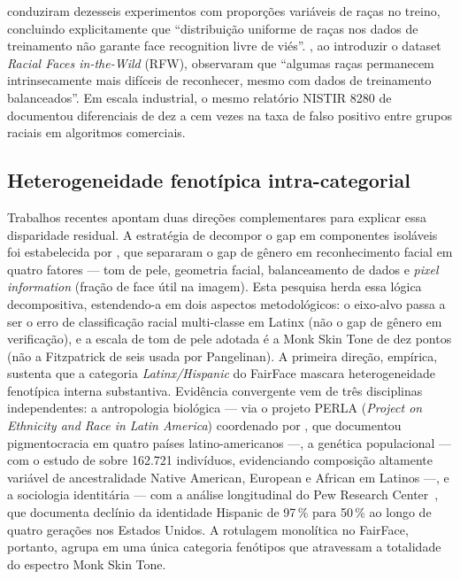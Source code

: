  conduziram dezesseis experimentos com proporções variáveis de raças no treino, concluindo explicitamente que ``distribuição uniforme de raças nos dados de treinamento não garante face recognition livre de viés''. , ao introduzir o dataset \emph{Racial Faces in-the-Wild} (RFW), observaram que ``algumas raças permanecem intrinsecamente mais difíceis de reconhecer, mesmo com dados de treinamento balanceados''. Em escala industrial, o mesmo relatório NISTIR 8280 de  documentou diferenciais de dez a cem vezes na taxa de falso positivo entre grupos raciais em algoritmos comerciais.

\subsection{Heterogeneidade fenotípica intra-categorial}
\label{sec:problema_heterogeneidade}

Trabalhos recentes apontam duas direções complementares para explicar essa disparidade residual. A estratégia de decompor o gap em componentes isoláveis foi estabelecida por , que separaram o gap de gênero em reconhecimento facial em quatro fatores --- tom de pele, geometria facial, balanceamento de dados e \emph{pixel information} (fração de face útil na imagem). Esta pesquisa herda essa lógica decompositiva, estendendo-a em dois aspectos metodológicos: o eixo-alvo passa a ser o erro de classificação racial multi-classe em Latinx (não o gap de gênero em verificação), e a escala de tom de pele adotada é a Monk Skin Tone de dez pontos (não a Fitzpatrick de seis usada por Pangelinan). A primeira direção, empírica, sustenta que a categoria \emph{Latinx/Hispanic} do FairFace mascara heterogeneidade fenotípica interna substantiva. Evidência convergente vem de três disciplinas independentes: a antropologia biológica --- via o projeto PERLA (\emph{Project on Ethnicity and Race in Latin America}) coordenado por , que documentou pigmentocracia em quatro países latino-americanos ---, a genética populacional --- com o estudo de  sobre 162.721 indivíduos, evidenciando composição altamente variável de ancestralidade Native American, European e African em Latinos ---, e a sociologia identitária --- com a análise longitudinal do Pew Research Center~\cite{lopez2017hispanic}, que documenta declínio da identidade Hispanic de 97\,\% para 50\,\% ao longo de quatro gerações nos Estados Unidos. A rotulagem monolítica no FairFace, portanto, agrupa em uma única categoria fenótipos que atravessam a totalidade do espectro Monk Skin Tone.

